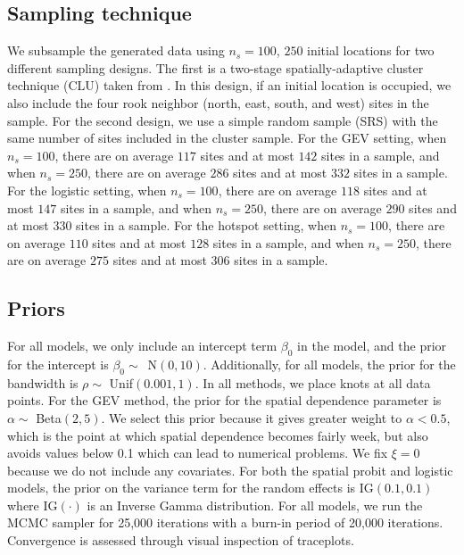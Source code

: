 \subsection{Sampling technique} \label{rbs:simsampling}
We subsample the generated data using $n_s = 100$, $250$ initial locations for two different sampling designs.
The first is a two-stage spatially-adaptive cluster technique (CLU) taken from \citet{Pacifici2016}.
In this design, if an initial location is occupied, we also include the four rook neighbor (north, east, south, and west) sites in the sample.
For the second design, we use a simple random sample (SRS) with the same number of sites included in the cluster sample.
For the GEV setting, when $n_s = 100$, there are on average $117$ sites and at most $142$ sites in a sample, and when $n_s = 250$, there are on average $286$ sites and at most $332$ sites in a sample.
For the logistic setting, when $n_s = 100$, there are on average $118$ sites and at most $147$ sites in a sample, and when $n_s = 250$, there are on average $290$ sites and at most $330$ sites in a sample.
For the hotspot setting, when $n_s = 100$, there are on average $110$ sites and at most $128$ sites in a sample, and when $n_s = 250$, there are on average $275$ sites and at most $306$ sites in a sample.

\subsection{Priors} \label{rbs:simpriors}
For all models, we only include an intercept term $\beta_0$ in the model, and the prior for the intercept is \mbox{$\beta_0 \sim$ N$(0, 10)$}.
Additionally, for all models, the prior for the bandwidth is $\rho \sim$ Unif$(0.001, 1)$.
In all methods, we place knots at all data points.
For the GEV method, the prior for the spatial dependence parameter is $\alpha \sim$ Beta$(2, 5)$.
We select this prior because it gives greater weight to $\alpha < 0.5$, which is the point at which spatial dependence becomes fairly week, but also avoids values below 0.1 which can lead to numerical problems.
We fix $\xi = 0$ because we do not include any covariates.
For both the spatial probit and logistic models, the prior on the variance term for the random effects is IG$(0.1, 0.1)$ where IG$(\cdot)$ is an Inverse Gamma distribution.
For all models, we run the MCMC sampler for 25,000 iterations with a burn-in period of 20,000 iterations.
Convergence is assessed through visual inspection of traceplots.

